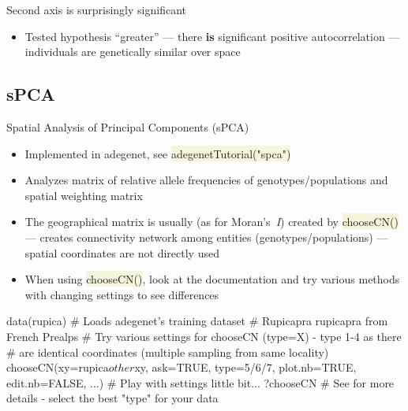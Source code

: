 \documentclass[compress, ucs, xelatex, 11pt, xcolor=svgnames, aspectratio=169,
	hyperref={
		bookmarks=true,
		unicode=true,
		colorlinks=true,
		pdftitle={Molecular data in R},
		plainpages=false,
		pdfauthor={Vojtech Zeisek},
		pdfsubject={Course about phylogeny and evolution in R},
		pdfcreator={XeLaTeX},
		pdfkeywords={R, evolution, phylogeny, molecular data},
		linkcolor=Crimson, %
		anchorcolor=Magenta, %
		citecolor=Magenta, %
		filecolor=Magenta, %
		menucolor=Magenta, %
		urlcolor=DodgerBlue, %
		pdftex},
	url={hyphens, lowtilde} %
	]{beamer}
\renewcommand{\texttt}[1]{\colorbox{Beige}{{\ttfamily #1}}}
\begin{document}
\begin{frame}{Second axis is surprisingly significant}
	\begin{center}
		\texttt{[image: moran2.png]}
	\end{center}
	\begin{itemize}
		\item Tested hypothesis \enquote{greater} --- there \textbf{is} significant positive autocorrelation --- individuals are genetically similar over space
	\end{itemize}
\end{frame}

\subsection{sPCA}

\begin{frame}[fragile]{Spatial Analysis of Principal Components (sPCA)}
	\begin{itemize}
		\item Implemented in adegenet, see \texttt{adegenetTutorial("spca")}
		\item Analyzes matrix of relative allele frequencies of genotypes/populations and spatial weighting matrix
		\item The geographical matrix is usually (as for Moran's~\textit{I}) created by \texttt{chooseCN()} --- creates connectivity network among entities (genotypes/populations) --- spatial coordinates are not directly used
		\item When using \texttt{chooseCN()}, look at the documentation and try various methods with changing settings to see differences
	\end{itemize}
	\begin{spluscode}
    data(rupica) # Loads adegenet's training dataset
                 # Rupicapra rupicapra from French Prealps
    # Try various settings for chooseCN (type=X) - type 1-4 as there
    # are identical coordinates (multiple sampling from same locality)
    chooseCN(xy=rupica$other$xy, ask=TRUE, type=5/6/7, plot.nb=TRUE,
      edit.nb=FALSE, ...) # Play with settings little bit...
    ?chooseCN # See for more details - select the best "type" for your data
	\end{spluscode}
\end{frame}
\end{document}
